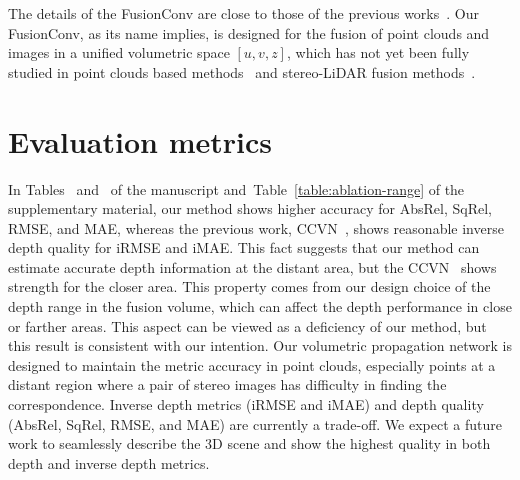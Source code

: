 \documentclass[letterpaper, 10 pt, conference]{ieeeconf}
\newcommand{\Tref}[1]{Table~\textcolor{blue}{\ref{#1}}}
\newcommand{\RNum}[1]{\uppercase\expandafter{\romannumeral #1\relax}}
\begin{document}
The details of the FusionConv are close to those of the previous works~\cite{continuous_conv,interp_conv}. Our FusionConv, as its name implies, is designed for the fusion of point clouds and images in a unified volumetric space $[u,v,z]$, which has not yet been fully studied in point clouds based methods~\cite{continuous_conv,interp_conv,pointnet,dynamic_graph_conv} and stereo-LiDAR fusion methods~\cite{stereolidar_00,stereolidar_01,stereolidar_norm_costV_ccvn}. 

\section{Evaluation metrics}
\label{supp-sec:Evaluation metrics}
In Tables~\textcolor{blue}{\RNum{1}} and~\textcolor{blue}{\RNum{2}} of the manuscript and~\Tref{table:ablation-range} of the supplementary material, our method shows higher accuracy for AbsRel, SqRel, RMSE, and MAE, whereas the previous work, CCVN~\cite{stereolidar_norm_costV_ccvn}, shows reasonable inverse depth quality for iRMSE and iMAE. This fact suggests that our method can estimate accurate depth information at the distant area, but the CCVN~\cite{stereolidar_norm_costV_ccvn} shows strength for the closer area. This property comes from our design choice of the depth range in the fusion volume, which can affect the depth performance in close or farther areas. 
This aspect can be viewed as a deficiency of our method, but this result is consistent with our intention. Our volumetric propagation network is designed to maintain the metric accuracy in point clouds, especially points at a distant region where a pair of stereo images has difficulty in finding the correspondence. Inverse depth metrics (iRMSE and iMAE) and depth quality (AbsRel, SqRel, RMSE, and MAE) are currently a trade-off. We expect a future work to seamlessly describe the 3D scene and show the highest quality in both depth and inverse depth metrics.
\end{document}
